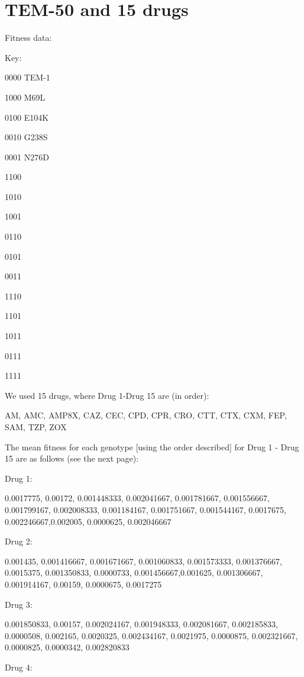 \documentclass[12pt]{amsart}
\theoremstyle{plain}
\theoremstyle{definition}
\begin{document}
{\newpage

\section{TEM-50 and 15 drugs}

Fitness data:

Key:

0000
TEM-1

1000
M69L

0100
E104K


0010
G238S

0001
N276D

1100

1010

1001

0110

0101

0011

1110

1101

1011

0111

1111

\bigskip

We used 15 drugs,
where Drug 1-Drug 15 
are (in order):

AM,
AMC, 
AMP8X,
CAZ,
CEC,
CPD,
CPR,
CRO,
CTT,
CTX,
CXM,
FEP,
SAM, 
TZP,
ZOX

The mean fitness for each genotype [using the order described] for Drug 1 - Drug 15 
 are as follows (see the next page):





\newpage
Drug 1:

0.0017775, 0.00172, 0.001448333, 0.002041667,
0.001781667, 0.001556667, 0.001799167, 0.002008333, 0.001184167, 0.001751667, 0.001544167, 0.0017675, 0.002246667,0.002005, 0.0000625, 0.002046667



\bigskip
Drug 2:

0.001435, 0.001416667, 0.001671667, 0.001060833, 0.001573333, 0.001376667, 0.0015375, 0.001350833, 0.0000733, 0.001456667,0.001625, 0.001306667, 0.001914167, 0.00159, 0.0000675, 0.0017275

\bigskip
Drug 3:

0.001850833, 0.00157, 0.002024167, 0.001948333, 0.002081667, 0.002185833, 0.0000508, 0.002165, 0.0020325, 0.002434167, 0.0021975, 0.0000875, 0.002321667, 0.0000825, 0.0000342, 0.002820833
      
\bigskip
Drug 4:

}
\end{document}
